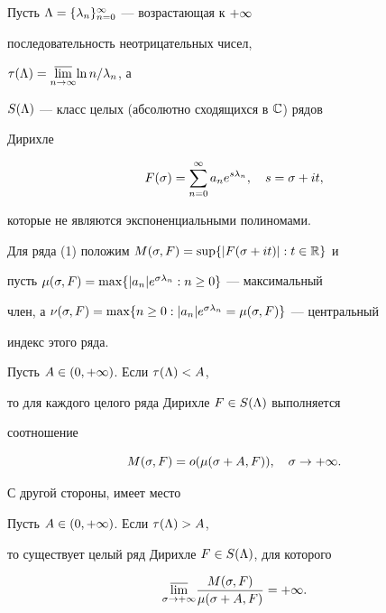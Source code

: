 Пусть $\Lambda=\{\lambda_n\}_{n=0}^\infty$ --- возрастающая к $+\infty$


последовательность неотрицательных чисел,


$\tau(\Lambda)=\underset{n\to\infty}{\varlimsup}{}{\ln n}/{\lambda_n}$, а 


$S(\Lambda)$ --- класс целых (абсолютно сходящихся в ${\Bbb C}$) рядов


Дирихле


\begin{equation}


F(\s)=\sum_{n=0}^\i a_ne^{s\l_n},\q s=\s+it,


\end{equation}


которые не являются экспоненциальными полиномами.


Для ряда (1) положим $M(\sigma,F)=\sup\{|F(\sigma+it)|:t\in {\Bbb R}\}$ и


пусть $\mu(\sigma,F)=\max\{|a_n|e^{\sigma\lambda_n}:n\ge 0\}$ --- максимальный


член, а $\nu(\sigma,F)=\max\{n\ge 0:|a_n|e^{\sigma\lambda_n}=\mu(\sigma,F)\}$ --- центральный


индекс этого ряда. 





\begin{athm}


Пусть $A\in(0,+\infty)$. Если $\tau(\Lambda)<A$,


то для каждого целого ряда Дирихле $F\in S(\Lambda)$ выполняется


соотношение  


$$


\M=o(\mu(\s+A,F)),\q \s\to+\i. 


$$


\end{athm}





С другой стороны, имеет место





\begin{athm}


Пусть $A\in(0,+\infty)$. Если $\tau(\Lambda)>A$,


то существует целый ряд Дирихле $F\in S(\Lambda)$, для которого


$$


\underset{\s\to+\i}{\vl}{}\frac{\M}{\mu(\s+A,F)}=+\i.


$$


\end{athm}





